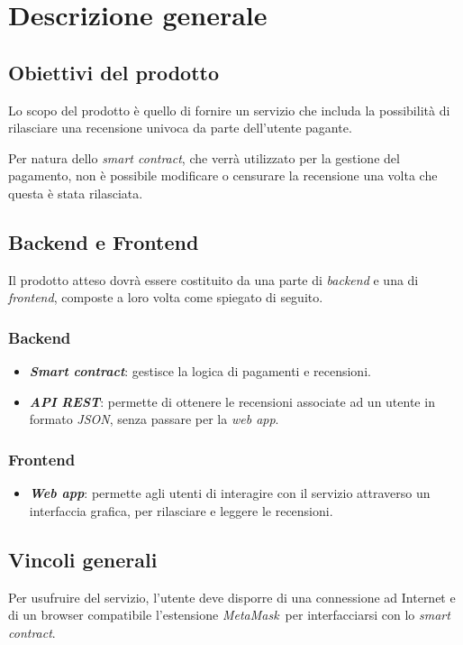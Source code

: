 \section{Descrizione generale}

    \subsection{Obiettivi del prodotto}
    Lo scopo del prodotto è quello di fornire un servizio che includa la possibilità di rilasciare una recensione univoca da parte dell'utente pagante.

    Per natura dello \textit{smart contract}, che verrà utilizzato per la gestione del pagamento, non è possibile modificare o censurare la recensione una volta che questa è stata rilasciata.

    \subsection{Backend e Frontend}
    Il prodotto atteso dovrà essere costituito da una parte di \textit{backend} e una di \textit{frontend}, composte a loro volta come spiegato di seguito.

        \subsubsection{Backend}
        \begin{itemize}
            \item \textit{\textbf{Smart contract}}: gestisce la logica di pagamenti e recensioni.
            \item \textit{\textbf{API REST}}\glo : permette di ottenere le recensioni associate ad un utente in formato \textit{JSON}\glo , senza passare per la \textit{web app}.
        \end{itemize}

        \subsubsection{Frontend}
        \begin{itemize}
            \item \textit{\textbf{Web app}}: permette agli utenti di interagire con il servizio attraverso un interfaccia grafica, per rilasciare e leggere le recensioni.
        \end{itemize}
    \subsection{Vincoli generali}
    Per usufruire del servizio, l'utente deve disporre di una connessione ad Internet e di un browser compatibile l'estensione \textit{MetaMask}\glo\ per interfacciarsi con lo \textit{smart contract}.